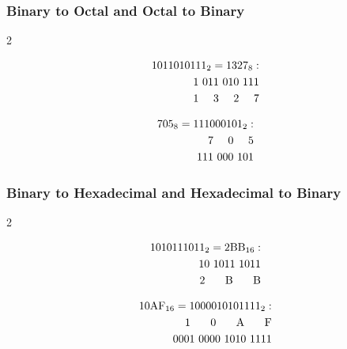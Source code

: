 \clearpage

\subsubsection{Binary to Octal and Octal to Binary}

\vspace{-\baselineskip}

\begin{multicols}{2}

  \begin{align*}
    {1011010111}_{2} = {1327}_{8} : \\
    \hphantom{}1\hphantom{\ }011\hphantom{\ }010\hphantom{\ }111 \\
    \hphantom{}1\hphantom{\ 00}3\hphantom{\ 00}2\hphantom{\ 00}7 \\
  \end{align*}

  \columnbreak

  \begin{align*}
    {705}_{8} = {111000101}_{2} : \\
    \hphantom{00}7\hphantom{\ 00}0\hphantom{\ 00}5 \\
    \hphantom{}111\hphantom{\ }000\hphantom{\ }101 \\
  \end{align*}

\end{multicols}

\subsubsection{Binary to Hexadecimal and Hexadecimal to Binary}

\vspace{-\baselineskip}

\begin{multicols}{2}

  \begin{align*}
    {1010111011}_{2} = \text{2BB}_{16} : \\
          \hphantom{}10\hphantom{\ }1011\hphantom{\ }1011  \\
    \text{\hphantom{0}2\hphantom{\ 000}B\hphantom{\ 000}B} \\
  \end{align*}

  \columnbreak

  \begin{align*}
    \text{10AF}_{16} = {1000010101111}_{2} : \\
    \text{\hphantom{000}1\hphantom{\ 000}0\hphantom{\ 000}A\hphantom{\ 000}F} \\
          \hphantom{}0001\hphantom{\ }0000\hphantom{\ }1010\hphantom{\ }1111  \\
  \end{align*}

\end{multicols}

